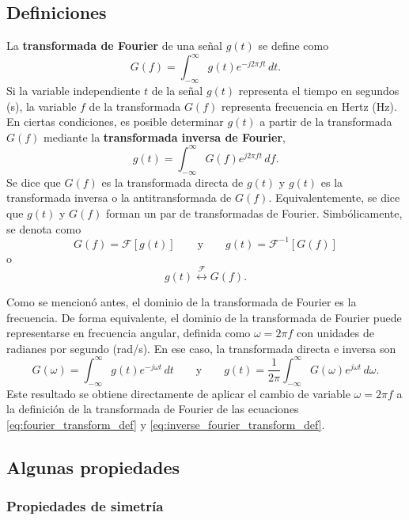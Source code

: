\documentclass[a4paper]{article}
\begin{document}
\subsection{Definiciones}

La \textbf{transformada de Fourier} de una señal \(g(t)\) se define como
\begin{equation}\label{eq:fourier_transform_def}
 G(f)=\int_{-\infty}^{\infty}g(t)e^{-j2\pi ft}\,dt.
\end{equation}
Si la variable independiente \(t\) de la señal \(g(t)\) representa el tiempo en segundos (s), la variable \(f\) de la transformada \(G(f)\) representa frecuencia en Hertz (Hz). En ciertas condiciones, es posible determinar \(g(t)\) a partir de la transformada \(G(f)\) mediante la \textbf{transformada inversa de Fourier},
\begin{equation}\label{eq:inverse_fourier_transform_def}
 g(t)=\int_{-\infty}^{\infty}G(f)e^{j2\pi ft}\,df.
\end{equation}
Se dice que \(G(f)\) es la transformada directa de \(g(t)\) y \(g(t)\) es la transformada inversa o la antitransformada de \(G(f)\). Equivalentemente, se dice que \(g(t)\) y \(G(f)\) forman un par de transformadas de Fourier. Simbólicamente, se denota como
\[
 G(f)=\mathcal{F}\left[g(t)\right]\qquad \textrm{y} \qquad g(t)=\mathcal{F}^{-1}\left[G(f)\right]
\]
o
\[
g(t)\overset{\mathcal{F}}{\longleftrightarrow}G(f).
\]

Como se mencionó antes, el dominio de la transformada de Fourier es la frecuencia. De forma equivalente, el dominio de la transformada de Fourier puede representarse en frecuencia angular, definida como \(\omega = 2\pi f\) con unidades de radianes por segundo (rad/s). En ese caso, la transformada directa e inversa son
\[
 G(\omega)=\int_{-\infty}^{\infty}g(t)e^{-j\omega t}\,dt \qquad\textrm{y}\qquad g(t)=\frac{1}{2\pi}\int_{-\infty}^{\infty}G(\omega)e^{j\omega t}\,d\omega.
\]
Este resultado se obtiene directamente de aplicar el cambio de variable \(\omega = 2\pi f\) a la definición de la transformada de Fourier de las ecuaciones \ref{eq:fourier_transform_def} y \ref{eq:inverse_fourier_transform_def}.

\subsection{Algunas propiedades}

\subsubsection{Propiedades de simetría}\label{ap:fourier_transform_property_symmetry}
\end{document}
